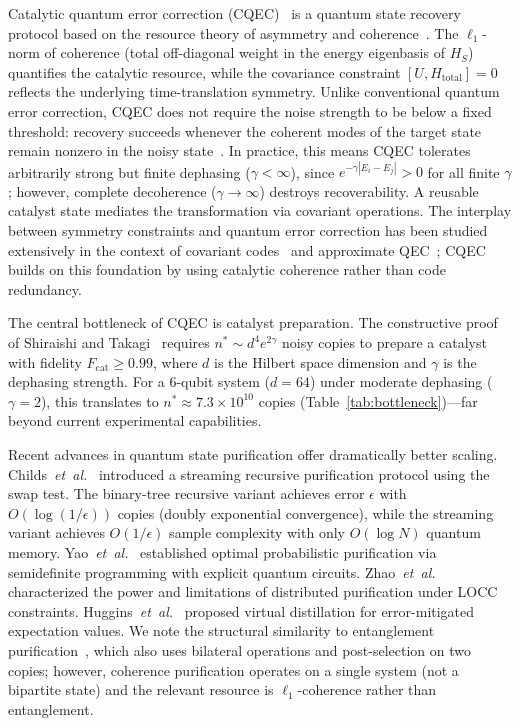 \documentclass[prx,twocolumn,superscriptaddress,longbibliography,floatfix]{revtex4-2}
\begin{document}
Catalytic quantum error correction (CQEC)~\cite{Wakaura2026} is a quantum state recovery protocol based on the resource theory of asymmetry and coherence~\cite{Shiraishi2024,Marvian2013,Marvian2014}.
The $\ell_1$-norm of coherence (total off-diagonal weight in the energy eigenbasis of $H_S$) quantifies the catalytic resource, while the covariance constraint $[U, H_\mathrm{total}] = 0$ reflects the underlying time-translation symmetry.
Unlike conventional quantum error correction, CQEC does not require the noise strength to be below a fixed threshold: recovery succeeds whenever the coherent modes of the target state remain nonzero in the noisy state~\cite{Wakaura2026}.
In practice, this means CQEC tolerates arbitrarily strong but finite dephasing ($\gamma < \infty$), since $e^{-\gamma|E_i-E_j|} > 0$ for all finite $\gamma$; however, complete decoherence ($\gamma \to \infty$) destroys recoverability.
A reusable catalyst state mediates the transformation via covariant operations.
The interplay between symmetry constraints and quantum error correction has been studied extensively in the context of covariant codes~\cite{Faist2020} and approximate QEC~\cite{Hayden2008}; CQEC builds on this foundation by using catalytic coherence rather than code redundancy.

The central bottleneck of CQEC is catalyst preparation.
The constructive proof of Shiraishi and Takagi~\cite{Shiraishi2024} requires $n^* \sim d^4 e^{2\gamma}$ noisy copies to prepare a catalyst with fidelity $F_\mathrm{cat} \geq 0.99$, where $d$ is the Hilbert space dimension and $\gamma$ is the dephasing strength.
For a 6-qubit system ($d = 64$) under moderate dephasing ($\gamma = 2$), this translates to $n^* \approx 7.3 \times 10^{10}$ copies (Table~\ref{tab:bottleneck})---far beyond current experimental capabilities.

Recent advances in quantum state purification offer dramatically better scaling.
Childs~\emph{et~al.}~\cite{Childs2025} introduced a streaming recursive purification protocol using the swap test.
The binary-tree recursive variant achieves error $\epsilon$ with $O(\log(1/\epsilon))$ copies (doubly exponential convergence), while the streaming variant achieves $O(1/\epsilon)$ sample complexity with only $O(\log N)$ quantum memory.
Yao~\emph{et~al.}~\cite{Yao2025} established optimal probabilistic purification via semidefinite programming with explicit quantum circuits.
Zhao~\emph{et~al.}~\cite{Zhao2026} characterized the power and limitations of distributed purification under LOCC constraints.
Huggins~\emph{et~al.}~\cite{Huggins2021} proposed virtual distillation for error-mitigated expectation values.
We note the structural similarity to entanglement purification~\cite{Bennett1996}, which also uses bilateral operations and post-selection on two copies; however, coherence purification operates on a single system (not a bipartite state) and the relevant resource is $\ell_1$-coherence rather than entanglement.
\end{document}
